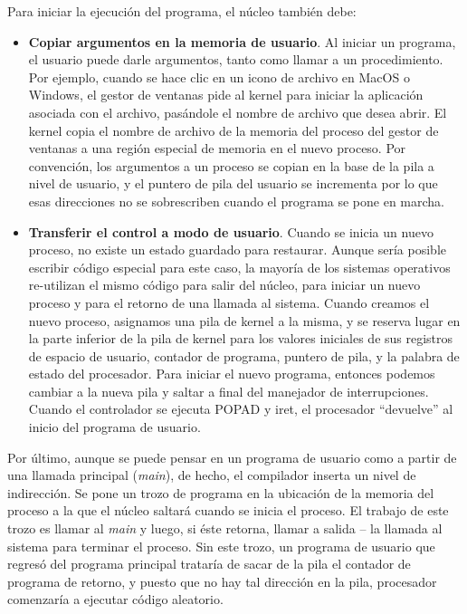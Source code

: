 \documentclass[10pt]{book}
\begin{document}
Para iniciar la ejecución del programa, el núcleo también debe:
\begin{itemize}
\item \textbf{Copiar argumentos en la memoria de usuario}. Al iniciar un programa, el usuario puede darle argumentos, tanto como llamar a un procedimiento. Por ejemplo, cuando se hace clic en un icono de archivo en MacOS o Windows, el gestor de ventanas pide al kernel para iniciar la aplicación asociada con el archivo, pasándole el nombre de archivo que desea abrir. El kernel copia el nombre de archivo de la memoria del proceso del gestor de ventanas a una región especial de memoria en el nuevo proceso. Por convención, los argumentos a un proceso se copian en la base de la pila a nivel de usuario, y el puntero de pila del usuario se incrementa por lo que esas direcciones no se sobrescriben cuando el programa se pone en marcha.

\item \textbf{Transferir el control a modo de usuario}. Cuando se inicia un nuevo proceso, no existe un estado guardado para restaurar. Aunque sería posible escribir código especial para este caso, la mayoría de los sistemas operativos re-utilizan el mismo código para salir del núcleo, para iniciar un nuevo proceso y para el retorno de una llamada al sistema. Cuando creamos el nuevo proceso, asignamos una pila de kernel a la misma, y se reserva lugar en la parte inferior de la pila de kernel para los valores iniciales de sus registros de espacio de usuario, contador de programa, puntero de pila, y la palabra de estado del procesador. Para iniciar el nuevo programa, entonces podemos cambiar a la nueva pila y saltar a final del manejador de interrupciones. Cuando el controlador se ejecuta {\mf POPAD} y {\mf iret}, el procesador ``devuelve'' al inicio del programa de usuario.
\end{itemize}

Por último, aunque se puede pensar en un programa de usuario como a partir de una llamada principal (\textit{main}), de hecho, el compilador inserta un nivel de indirección. Se pone un trozo de programa en la ubicación de la memoria del proceso a la que el núcleo saltará cuando se inicia el proceso. El trabajo de este trozo es llamar al \textit{main} y luego, si éste retorna, llamar a salida -- la llamada al sistema para terminar el proceso. Sin este trozo, un programa de usuario que regresó del programa principal trataría de sacar de la pila el contador de programa de retorno, y puesto que no hay tal dirección en la pila, procesador comenzaría a ejecutar código aleatorio.
\end{document}
